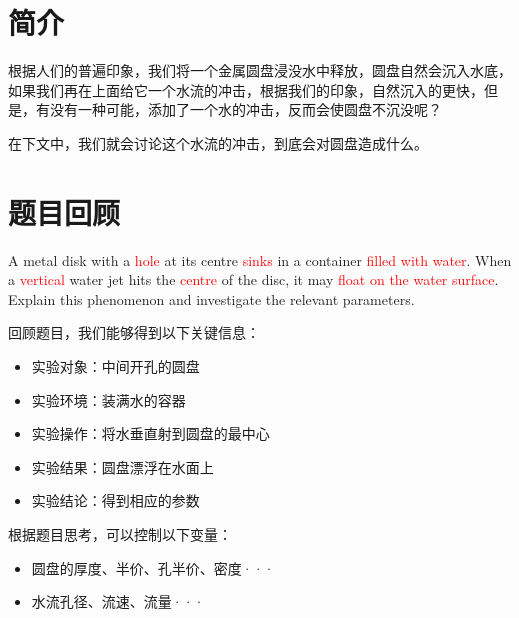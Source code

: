\documentclass[UTF8]{gapd}
\begin{document}
\maketitle


\section{简介}
\label{sec:unsinkable_disc_introduction}
根据人们的普遍印象，我们将一个金属圆盘浸没水中释放，圆盘自然会沉入水底，如果我们再在上面给它一个水流的冲击，根据我们的印象，自然沉入的更快，但是，有没有一种可能，添加了一个水的冲击，反而会使圆盘不沉没呢？

在下文中，我们就会讨论这个水流的冲击，到底会对圆盘造成什么。

\section{题目回顾}
\label{sec:unsinkable_disc_title_review}
A metal disk with a \textcolor{red}{hole} at its centre \textcolor{red}{sinks} in a container \textcolor{red}{filled with water}. When a \textcolor{red}{vertical} water jet hits the \textcolor{red}{centre} of the disc, it may \textcolor{red}{float on the water surface}. Explain this phenomenon and investigate the relevant parameters.

回顾题目，我们能够得到以下关键信息：
\begin{itemize}
    \item 实验对象：中间开孔的圆盘
    \item 实验环境：装满水的容器
    \item 实验操作：将水垂直射到圆盘的最中心
    \item 实验结果：圆盘漂浮在水面上
    \item 实验结论：得到相应的参数
\end{itemize}

根据题目思考，可以控制以下变量：
\begin{itemize}
    \item 圆盘的厚度、半价、孔半价、密度···
    \item 水流孔径、流速、流量···
\end{itemize}
\end{document}
